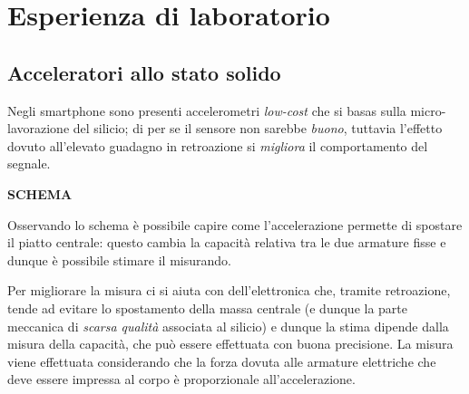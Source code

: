 \chapter{Esperienza di laboratorio}
\section{Acceleratori allo stato solido}
	Negli smartphone sono presenti accelerometri \textit{low-cost} che si basas sulla micro-lavorazione del silicio; di per se il sensore non sarebbe \textit{buono}, tuttavia l'effetto dovuto all'elevato guadagno in retroazione si \textit{migliora} il comportamento del segnale.
	
	\textbf{SCHEMA}
	
	Osservando lo schema è possibile capire come l'accelerazione permette di spostare  il piatto centrale: questo cambia la capacità relativa tra le due armature fisse e dunque è possibile stimare il misurando. 
	
	Per migliorare la misura ci si aiuta con dell'elettronica che, tramite retroazione, tende ad evitare lo spostamento della massa centrale (e dunque la parte meccanica di \textit{scarsa qualità} associata al silicio) e dunque la stima dipende dalla misura della capacità, che può essere effettuata con buona precisione. La misura viene effettuata considerando che la forza dovuta alle armature elettriche che deve essere impressa al corpo è proporzionale all'accelerazione.
	
	
	